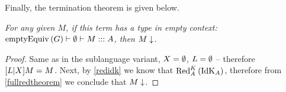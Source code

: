 Finally, the termination theorem is given below.
\begin{theorem}\em
For any given $M$, if this term has a type in empty context: $\emptyEq G |- \nnil |- M ::: A$, then $\termin{M}$.
\begin{proof}
Same as in the sublanguage variant, $X = \nnil$, $L=\nnil$ -- therefore $\substt{L}{X}{M} = M$. Next, by \ref{redidk} we know that $\RedK{(\IdK{A})}{A}$, therefore from \ref{fullredtheorem} we conclude that $\termin{M}$.
\end{proof}
\end{theorem}
